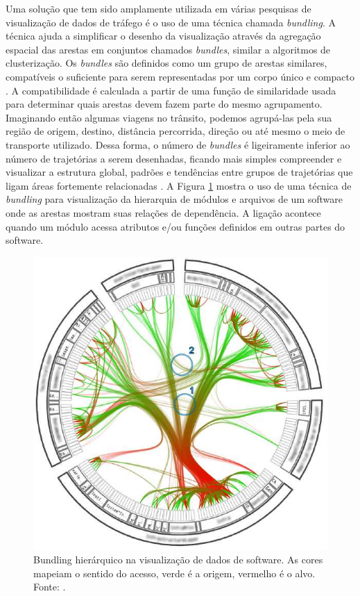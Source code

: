  Uma solução que tem sido amplamente utilizada em várias pesquisas de
visualização de dados de tráfego é o uso de uma técnica chamada
\emph{bundling}. A técnica ajuda a simplificar o desenho da visualização
através da agregação espacial das arestas em conjuntos chamados
\emph{bundles}, similar a algoritmos de clusterização. Os \emph{bundles} são
definidos como um grupo de arestas similares, compatíveis o suficiente para
serem representadas por um corpo único e compacto \citep{Lhuillier2017}. A
compatibilidade é calculada a partir de uma função de similaridade usada para
determinar quais arestas devem fazem parte do mesmo agrupamento.
Imaginando então algumas viagens no trânsito, podemos agrupá-las pela sua
região de origem, destino, distância percorrida, direção ou até mesmo o meio de
transporte utilizado.  Dessa forma, o número de \emph{bundles} é ligeiramente
inferior ao número de trajetórias a serem desenhadas, ficando mais simples
compreender e visualizar a estrutura global, padrões e tendências entre grupos
de trajetórias que ligam áreas fortemente relacionadas \citep{Zhou2013}.  A
Figura \ref{fig:bundling-hierarquico} mostra o uso de uma técnica de
\emph{bundling} para visualização da hierarquia de módulos e arquivos de um
software onde as arestas mostram suas relações de dependência. A ligação
acontece quando um módulo acessa atributos e/ou funções definidos em outras partes
do software.

\begin{figure}[!htb]
  \centering
  \includegraphics[width=.5\textwidth]{../figuras/hbundling.png}
  \caption[Bundling hierárquico na visualização de dados de software]{Bundling hierárquico na visualização de dados de software. As cores mapeiam
o sentido do acesso, verde é a origem, vermelho é o alvo. Fonte: \citep{Holten2006}.}
  \label{fig:bundling-hierarquico}
\end{figure}

